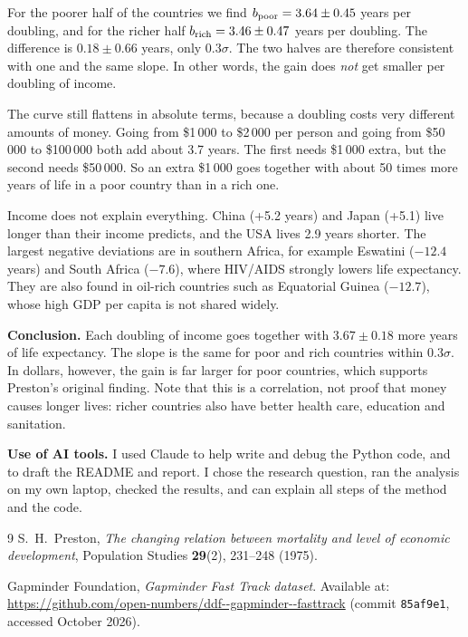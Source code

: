 \documentclass{article}
\begin{document}
For the poorer half of the countries we find
$b_{\rm poor} = 3.64 \pm 0.45$ years per doubling, and for the richer half
$b_{\rm rich} = 3.46 \pm 0.47$ years per doubling. The difference is
$0.18 \pm 0.66$ years, only $0.3\sigma$. The two halves are therefore
consistent with one and the same slope. In other words, the gain does
\emph{not} get smaller per doubling of income.

The curve still flattens in absolute terms, because a doubling costs very
different amounts of money. Going from \$1\,000 to \$2\,000 per person and
going from \$50\,000 to \$100\,000 both add about 3.7 years. The first needs
\$1\,000 extra, but the second needs \$50\,000. So an extra \$1\,000 goes
together with about 50 times more years of life in a poor country than in a
rich one.

Income does not explain everything. China (+5.2 years) and Japan (+5.1)
live longer than their income predicts, and the USA lives 2.9 years shorter.
The largest negative deviations are in southern Africa, for example Eswatini
($-12.4$ years) and South Africa ($-7.6$), where HIV/AIDS strongly lowers
life expectancy. They are also found in oil-rich countries such as Equatorial
Guinea ($-12.7$), whose high GDP per capita is not shared widely.

\textbf{Conclusion.} Each doubling of income goes together with
$3.67 \pm 0.18$ more years of life expectancy. The slope is the same for poor
and rich countries within $0.3\sigma$. In dollars, however, the gain is far
larger for poor countries, which supports Preston's original finding. Note
that this is a correlation, not proof that money causes longer lives: richer
countries also have better health care, education and sanitation.

\noindent\textbf{Use of AI tools.} I used Claude to help write and debug the Python code, and to draft the README and report. I chose the research question, ran the analysis on my own laptop, checked the results, and can explain all steps of the method and the code.

\begin{thebibliography}{9}
S.~H.~Preston, \textit{The changing relation between mortality and level of
economic development}, Population Studies \textbf{29}(2), 231--248 (1975).

Gapminder Foundation, \textit{Gapminder Fast Track dataset}. Available at:
\url{https://github.com/open-numbers/ddf--gapminder--fasttrack}
(commit \texttt{85af9e1}, accessed October 2026).
\end{thebibliography}
\end{document}
